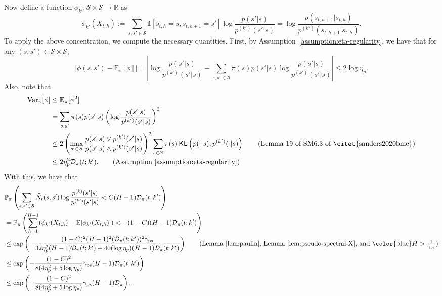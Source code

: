 \documentclass[twoside]{article}
\DeclareMathOperator{\KL}{{\mathsf{KL}}}
\def\gD{{\mathcal{D}}}
\def\gS{{\mathcal{S}}}
\def\sP{{\mathbb{P}}}
\def\sR{{\mathbb{R}}}
\newcommand{\E}{\mathbb{E}}
\newcommand{\Var}{\mathrm{Var}}
\theoremstyle{plain}
\newcommand{\indicator}{\mathds{1}}
\newcommand{\ps}{\mathrm{ps}}
\begin{document}
Now define a function $\phi_{k'} : \gS \times \gS \rightarrow \sR$ as
\begin{equation}
    \phi_{k'}(X_{t,h}) := \sum_{s, s' \in \gS} \indicator[s_{t,h} = s, s_{t,h+1} = s'] \log\frac{p(s' | s)}{p^{(k')}(s' | s)}
    = \log\frac{p(s_{t,h+1} | s_{t,h})}{p^{(k')}(s_{t,h+1} | s_{t,h})}.
\end{equation}
To apply the above concentration, we compute the necessary quantities.
First, by Assumption~\ref{assumption:eta-regularity}, we have that for any $(s, s') \in \gS \times \gS$,
\begin{equation*}
    |\phi(s, s') - \E_\pi[\phi]| = \left| \log\frac{p(s' | s)}{p^{(k')}(s' | s)} - \sum_{s, s' \in \gS} \pi(s) p(s' | s) \log\frac{p(s' | s)}{p^{(k')}(s' | s)} \right|
    \leq 2 \log\eta_p.
\end{equation*}
Also, note that 
\begin{align*}
    \Var_\pi[\phi] &\leq \E_\pi[\phi^2] \\
    &= \sum_{s, s'} \pi(s) p(s' | s) \left( \log\frac{p(s' | s)}{p^{(k')}(s' | s)} \right)^2 \\
    &\leq 2 \left( \max_{s' \in \gS} \frac{p(s' | s) \vee p^{(k')}(s' | s)}{p(s' | s) \wedge p^{(k')}(s' | s)} \right)^2 \sum_{s \in \gS} \pi(s) \KL\left( p(\cdot | s), p^{(k')}(\cdot | s) \right) \tag{Lemma 19 of SM6.3 of \citet{sanders2020bmc}} \\
    &\leq 2\eta_p^2 \gD_\pi(t; k'). \tag{Assumption~\ref{assumption:eta-regularity}}
\end{align*}
With this, we have that
\begin{align*}
    &\sP_\pi\left( \sum_{s, s' \in \gS} \widehat{N}_t(s, s') \log \frac{p^{(k)}(s' | s)}{p^{(k')}(s' | s)} < C (H - 1) \gD_\pi(t; k') \right) \\
    &= \sP_\pi\left( \sum_{h=1}^{H-1} (\phi_{k'}(X_{t,h}) - \E[\phi_{k'}(X_{t,h})]) < - (1 - C) (H - 1) \gD_\pi(t; k') \right) \\
    &\leq \exp\left( - \frac{(1 - C)^2 (H - 1)^2 (\gD_\pi(t; k'))^2 \gamma_\ps}{32 \eta_p^2 (H - 1) \gD_\pi(t; k') + 40 (\log \eta_p) (H - 1) \gD_\pi(t; k')} \right) \tag{Lemma~\ref{lem:paulin}, Lemma~\ref{lem:pseudo-spectral-X}, and {\color{blue}$H > \frac{1}{\gamma_\ps}$}} \\
    &\leq \exp\left( - \frac{(1 - C)^2}{8(4\eta_p^2 + 5 \log\eta_p)} \gamma_\ps (H - 1) \gD_\pi(t; k') \right) \\
    &\leq \exp\left( - \frac{(1 - C)^2}{8(4\eta_p^2 + 5 \log\eta_p)} \gamma_\ps (H - 1) \gD_\pi \right).
\end{align*}
\end{document}
